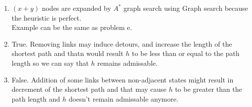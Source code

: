 \documentclass[11pt]{article}
\begin{document}
\begin{enumerate}[label=(\alph*)]
  \item $(x+y)$ nodes are expanded by $A^*$ graph search using Graph search because the heuristic is perfect.\\
  Example can be the same as problem e.
  \item True. Removing links may induce detours, and increase the length of the shortest path and thatn would result $h$ to be less than or equal
  to the path length so we can say that $h$ remains admissable.
  \item False. Addition of some links between non-adjacent states might result in decrement of the shortest path and that may cause
  $h$ to be greater than the path length and $h$ doesn't remain admissable anymore.
\end{enumerate}
\end{document}
